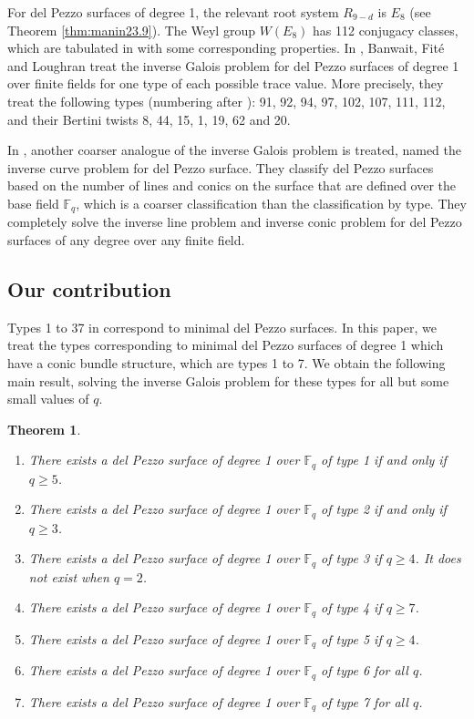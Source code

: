 \documentclass[a4paper, 11pt, reqno]{amsart}
\numberwithin{equation}{section} \numberwithin{figure}{section}
\def \F {{\mathbb F}}
\newtheorem{theorem}[lemma]{Theorem}
\theoremstyle{definition}
\numberwithin{lemma}{section}
\begin{document}
For del Pezzo surfaces of degree 1, the relevant root system $R_{9-d}$ is $E_8$ (see Theorem \ref{thm:manin23.9}). The Weyl group $W(E_8)$ has 112 conjugacy classes, which are tabulated in \cite[Table 2]{urabe2} with some corresponding properties. In \cite{BFL}, Banwait, Fit\'{e} and Loughran treat the inverse Galois problem for del Pezzo surfaces of degree 1 over finite fields for one type of each possible trace value. More precisely, they treat the following types (numbering after \cite{urabe1, urabe2}): 91, 92, 94, 97, 102, 107, 111, 112, and their Bertini twists 8, 44, 15, 1, 19, 62 and 20. 

In \cite{ICP}, another coarser analogue of the inverse Galois problem is treated, named the inverse curve problem for del Pezzo surface. They classify del Pezzo surfaces based on the number of lines and conics on the surface that are defined over the base field $\F_q$, which is a coarser classification than the classification by type. They completely solve the inverse line problem and inverse conic problem for del Pezzo surfaces of any degree over any finite field.

\subsection{Our contribution}
Types 1 to 37 in \cite{urabe2} correspond to minimal del Pezzo surfaces. In this paper, we treat the types corresponding to minimal del Pezzo surfaces of degree 1 which have a conic bundle structure, which are types 1 to 7. We obtain the following main result, solving the inverse Galois problem for these types for all but some small values of $q$. 

\begin{theorem}\label{thm:mainthm}
    \begin{enumerate}
        \item There exists a del Pezzo surface of degree 1 over $\F_q$ of type 1 if and only if $q \geq 5$.
        \item There exists a del Pezzo surface of degree 1 over $\F_q$ of type 2 if and only if $q \geq 3$.
        \item There exists a del Pezzo surface of degree 1 over $\F_q$ of type 3 if $q \geq 4$. It does not exist when $q = 2$.
        \item There exists a del Pezzo surface of degree 1 over $\F_q$ of type 4 if $q \geq 7$.
        \item There exists a del Pezzo surface of degree 1 over $\F_q$ of type 5 if $q \geq 4$.
        \item There exists a del Pezzo surface of degree 1 over $\F_q$ of type 6 for all $q$.
        \item There exists a del Pezzo surface of degree 1 over $\F_q$ of type 7 for all $q$.
    \end{enumerate}
\end{theorem}
\end{document}
